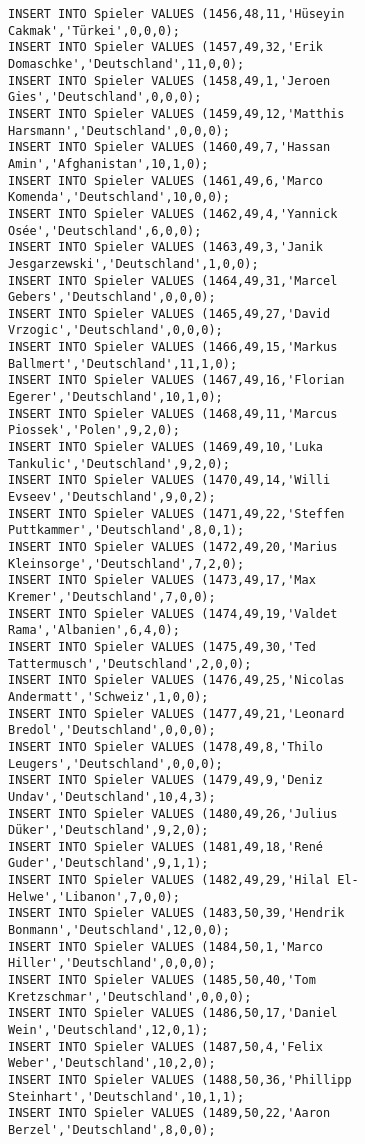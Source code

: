 \documentclass{lehramt-informatik-aufgabe}
\begin{document}
\begin{verbatim}
INSERT INTO Spieler VALUES (1456,48,11,'Hüseyin Cakmak','Türkei',0,0,0);
INSERT INTO Spieler VALUES (1457,49,32,'Erik Domaschke','Deutschland',11,0,0);
INSERT INTO Spieler VALUES (1458,49,1,'Jeroen Gies','Deutschland',0,0,0);
INSERT INTO Spieler VALUES (1459,49,12,'Matthis Harsmann','Deutschland',0,0,0);
INSERT INTO Spieler VALUES (1460,49,7,'Hassan Amin','Afghanistan',10,1,0);
INSERT INTO Spieler VALUES (1461,49,6,'Marco Komenda','Deutschland',10,0,0);
INSERT INTO Spieler VALUES (1462,49,4,'Yannick Osée','Deutschland',6,0,0);
INSERT INTO Spieler VALUES (1463,49,3,'Janik Jesgarzewski','Deutschland',1,0,0);
INSERT INTO Spieler VALUES (1464,49,31,'Marcel Gebers','Deutschland',0,0,0);
INSERT INTO Spieler VALUES (1465,49,27,'David Vrzogic','Deutschland',0,0,0);
INSERT INTO Spieler VALUES (1466,49,15,'Markus Ballmert','Deutschland',11,1,0);
INSERT INTO Spieler VALUES (1467,49,16,'Florian Egerer','Deutschland',10,1,0);
INSERT INTO Spieler VALUES (1468,49,11,'Marcus Piossek','Polen',9,2,0);
INSERT INTO Spieler VALUES (1469,49,10,'Luka Tankulic','Deutschland',9,2,0);
INSERT INTO Spieler VALUES (1470,49,14,'Willi Evseev','Deutschland',9,0,2);
INSERT INTO Spieler VALUES (1471,49,22,'Steffen Puttkammer','Deutschland',8,0,1);
INSERT INTO Spieler VALUES (1472,49,20,'Marius Kleinsorge','Deutschland',7,2,0);
INSERT INTO Spieler VALUES (1473,49,17,'Max Kremer','Deutschland',7,0,0);
INSERT INTO Spieler VALUES (1474,49,19,'Valdet Rama','Albanien',6,4,0);
INSERT INTO Spieler VALUES (1475,49,30,'Ted Tattermusch','Deutschland',2,0,0);
INSERT INTO Spieler VALUES (1476,49,25,'Nicolas Andermatt','Schweiz',1,0,0);
INSERT INTO Spieler VALUES (1477,49,21,'Leonard Bredol','Deutschland',0,0,0);
INSERT INTO Spieler VALUES (1478,49,8,'Thilo Leugers','Deutschland',0,0,0);
INSERT INTO Spieler VALUES (1479,49,9,'Deniz Undav','Deutschland',10,4,3);
INSERT INTO Spieler VALUES (1480,49,26,'Julius Düker','Deutschland',9,2,0);
INSERT INTO Spieler VALUES (1481,49,18,'René Guder','Deutschland',9,1,1);
INSERT INTO Spieler VALUES (1482,49,29,'Hilal El-Helwe','Libanon',7,0,0);
INSERT INTO Spieler VALUES (1483,50,39,'Hendrik Bonmann','Deutschland',12,0,0);
INSERT INTO Spieler VALUES (1484,50,1,'Marco Hiller','Deutschland',0,0,0);
INSERT INTO Spieler VALUES (1485,50,40,'Tom Kretzschmar','Deutschland',0,0,0);
INSERT INTO Spieler VALUES (1486,50,17,'Daniel Wein','Deutschland',12,0,1);
INSERT INTO Spieler VALUES (1487,50,4,'Felix Weber','Deutschland',10,2,0);
INSERT INTO Spieler VALUES (1488,50,36,'Phillipp Steinhart','Deutschland',10,1,1);
INSERT INTO Spieler VALUES (1489,50,22,'Aaron Berzel','Deutschland',8,0,0);

\end{verbatim}
\end{document}
